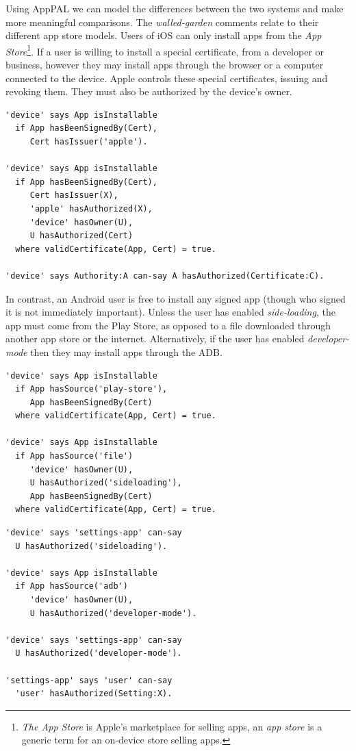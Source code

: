 \documentclass[thesis.tex]{subfiles}
\begin{document}
Using AppPAL we can model the differences between the two systems and make more
meaningful comparisons. The \emph{walled-garden} comments relate to their
different app store models. Users of iOS can only install apps from the \emph{App
Store}\footnote{\emph{The App Store} is Apple's marketplace for selling apps, an
\emph{app store} is a generic term for an on-device store selling apps.}. If a
user is willing to install a special certificate, from a developer or business,
however they may install apps through the browser or a computer connected to the
device. Apple controls these special certificates, issuing and revoking them.
They must also be authorized by the device's owner.
\begin{lstlisting}
'device' says App isInstallable
  if App hasBeenSignedBy(Cert),
     Cert hasIssuer('apple').

'device' says App isInstallable
  if App hasBeenSignedBy(Cert),
     Cert hasIssuer(X),
     'apple' hasAuthorized(X),
     'device' hasOwner(U),
     U hasAuthorized(Cert)
  where validCertificate(App, Cert) = true.

'device' says Authority:A can-say A hasAuthorized(Certificate:C).
\end{lstlisting}
In contrast, an Android user is free to install any signed app (though
who signed it is not immediately important).  Unless the user has
enabled \emph{side-loading}, the app must come from the Play Store, as
opposed to a file downloaded through another app store or the
internet.  Alternatively, if the user has enabled
\emph{developer-mode} then they may install apps through the \ac{ADB}.

\noindent\begin{minipage}{\textwidth}\vspace{1em}
\begin{lstlisting}
'device' says App isInstallable
  if App hasSource('play-store'),
     App hasBeenSignedBy(Cert)
  where validCertificate(App, Cert) = true.

'device' says App isInstallable
  if App hasSource('file')
     'device' hasOwner(U),
     U hasAuthorized('sideloading'),
     App hasBeenSignedBy(Cert)
  where validCertificate(App, Cert) = true.
\end{lstlisting}
\end{minipage}

\noindent\begin{minipage}{\textwidth}
\begin{lstlisting}
'device' says 'settings-app' can-say
  U hasAuthorized('sideloading').

'device' says App isInstallable
  if App hasSource('adb')
     'device' hasOwner(U),
     U hasAuthorized('developer-mode').

'device' says 'settings-app' can-say
  U hasAuthorized('developer-mode').

'settings-app' says 'user' can-say
  'user' hasAuthorized(Setting:X).
\end{lstlisting}
\end{minipage}
\end{document}
